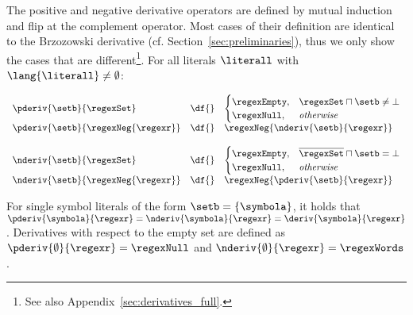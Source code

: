 The positive and negative derivative operators are defined by mutual
induction and flip at the {complement operator}. Most cases of their
definition are identical to the Brzozowski derivative
(cf. Section~\ref{sec:preliminaries}), thus we only show the cases that are
different\footnote{See also Appendix~\ref{sec:derivatives_full}.}. For all literals $\literall$ with $\lang{\literall}\neq\emptyset$:

\vspace{-\baselineskip}
\begin{minipage}[t]{0.4\textwidth}
  \begin{align*}
    \begin{array}{lll}
      \pderiv{\setb}{\regexSet} &\df{}& \begin{cases}
        \regexEmpty, & \regexSet\sqcap\setb\ne\bot \\
        \regexNull, & \textit{otherwise}
      \end{cases}\\
      \pderiv{\setb}{\regexNeg{\regexr}} &\df{}&  \regexNeg{\nderiv{\setb}{\regexr}}\\
    \end{array}
  \end{align*}
\end{minipage}
\begin{minipage}[t]{0.4\textwidth} 
  \begin{align*}
    \begin{array}{lll}
      \nderiv{\setb}{\regexSet} &\df{}& \begin{cases}
        \regexEmpty, & \overline{\regexSet}\sqcap\setb=\bot\\
        \regexNull, & \textit{otherwise}
      \end{cases}\\
      \nderiv{\setb}{\regexNeg{\regexr}} &\df{}&  \regexNeg{\pderiv{\setb}{\regexr}}\\
    \end{array}
  \end{align*}
\end{minipage}
\vspace{\baselineskip}

\noindent
For single symbol literals of the form $\setb=\{\symbola\}$, it holds
that  $\pderiv{\symbola}{\regexr}=\nderiv{\symbola}{\regexr}=\deriv{\symbola}{\regexr}$.
Derivatives with respect to the empty set are defined as
$\pderiv{\emptyset}{\regexr}=\regexNull$ and $\nderiv{\emptyset}{\regexr}=\regexWords$.

